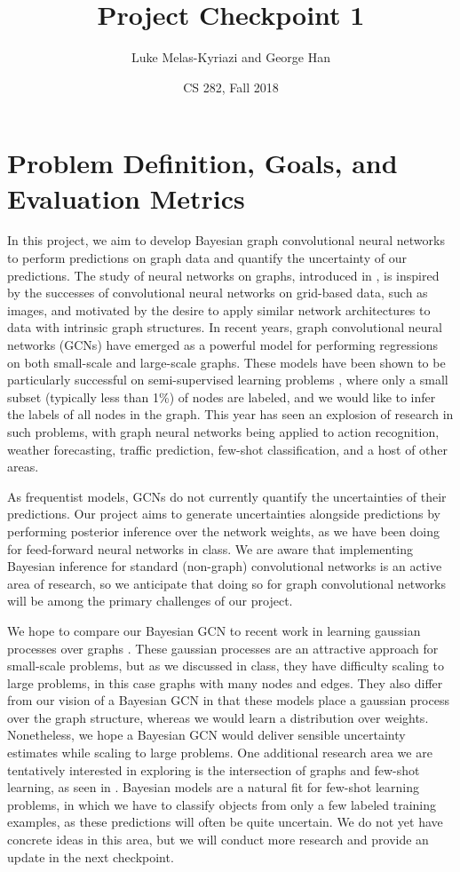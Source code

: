 \documentclass[11pt,letterpaper]{article}
\title{Project Checkpoint 1}
\author{Luke Melas-Kyriazi and George Han}
\date{CS 282, Fall 2018}
\begin{document}
\maketitle

\section*{Problem Definition, Goals, and Evaluation Metrics}

In this project, we aim to develop Bayesian graph convolutional neural networks to perform predictions on graph data and quantify the uncertainty of our predictions. The study of neural networks on graphs, introduced in \citet{gnn09}, is inspired by the successes of convolutional neural networks on grid-based data, such as images, and motivated by the desire to apply similar network architectures to data with intrinsic graph structures. In recent years, graph convolutional neural networks (GCNs) have emerged as a powerful model for performing regressions on both small-scale \citep{gcn_nips15} and large-scale \citep{graphsage_nips17} graphs. These models have been shown to be particularly successful on semi-supervised learning problems \citep{gcniclr17}, where only a small subset (typically less than 1\%) of nodes are labeled, and we would like to infer the labels of all nodes in the graph. This year has seen an explosion of research in such problems, with graph neural networks being applied to action recognition, weather forecasting, traffic prediction, few-shot classification, and a host of other areas. 

As frequentist models, GCNs do not currently quantify the uncertainties of their predictions. Our project aims to generate uncertainties alongside predictions by performing posterior inference over the network weights, as we have been doing for feed-forward neural networks in class. We are aware that implementing Bayesian inference for standard (non-graph) convolutional networks is an active area of research, so we anticipate that doing so for graph convolutional networks will be among the primary challenges of our project. 

We hope to compare our Bayesian GCN to recent work in learning gaussian processes over graphs \citep{ng2018bayesian}. These gaussian processes are an attractive approach for small-scale problems, but as we discussed in class, they have difficulty scaling to large problems, in this case graphs with many nodes and edges. They also differ from our vision of a Bayesian GCN in that these models place a gaussian process over the graph structure, whereas we would learn a distribution over weights. Nonetheless, we hope a Bayesian GCN would deliver sensible uncertainty estimates while scaling to large problems. One additional research area we are tentatively interested in exploring is the intersection of graphs and few-shot learning, as seen in \citet{few_shot_gcn_iclr18}. Bayesian models are a natural fit for few-shot learning problems, in which we have to classify objects from only a few labeled training examples, as these predictions will often be quite uncertain. We do not yet have concrete ideas in this area, but we will conduct more research and provide an update in the next checkpoint. 
\end{document}

